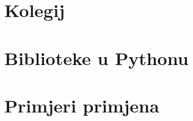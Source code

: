 \maketitle
\newpage
{}
\setcounter{page}{1}

\clearpage

\cleardoublepage
{}

\tableofcontents

\clearpage
{}

\chapter{Kolegij}


















\clearpage
{}

\chapter{Biblioteke u Pythonu}



\chapter{Primjeri primjena}

